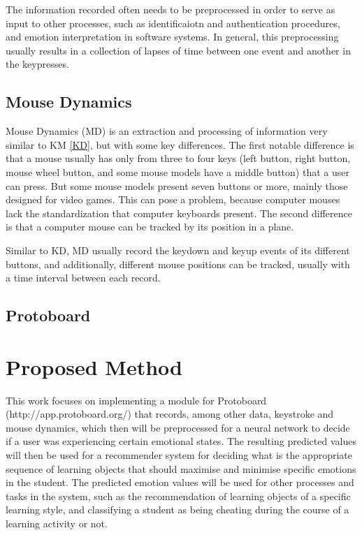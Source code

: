 \documentclass{acm_proc_article-sp}
\begin{document}
The information recorded often needs to be preprocessed in order to
serve as input to other processes, such as identificaiotn and
authentication procedures, and emotion interpretation in software
systems. In general, this preprocessing usually results in a
collection of lapses of time between one event and another in the
keypresses.


\subsection{Mouse Dynamics}

Mouse Dynamics (MD) is an extraction and processing of information
very similar to KM \ref{KD}, but with some key differences. The first
notable difference is that a mouse usually has only from three to four
keys (left button, right button, mouse wheel button, and some mouse
models have a middle button) that a user can press. But some mouse
models present seven buttons or more, mainly those designed for video
games. This can pose a problem, because computer mouses lack the
standardization that computer keyboards present. The second difference 
is that a computer mouse can be tracked by its position in a plane.

Similar to KD, MD usually record the keydown and keyup events of its
different buttons, and additionally, different mouse positions can be
tracked, usually with a time interval between each record.


\subsection{Protoboard}


\section{Proposed Method}

This work focuses on implementing a module for Protoboard (http://app.protoboard.org/) that
records, among other data, keystroke and mouse dynamics, which then
will be preprocessed for a neural network to decide if a user was
experiencing certain emotional states. The resulting predicted values
will then be used for a recommender system for deciding what is the
appropriate sequence of learning objects that should maximise and
minimise specific emotions in the student. The predicted emotion
values will be used for other processes and tasks in the system, such
as the recommendation of learning objects of a specific learning
style, and classifying a student as being cheating during the course
of a learning activity or not.
\end{document}
